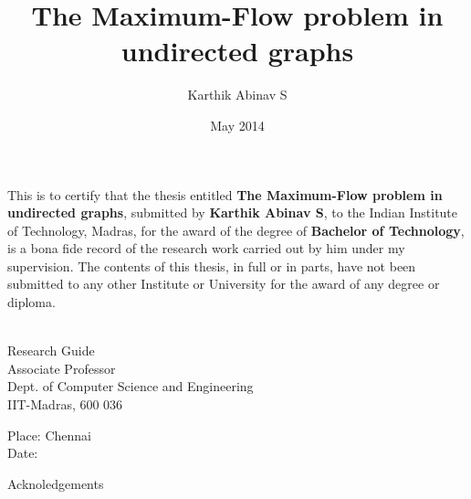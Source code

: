 \documentclass[BTech]{iitmdiss}
\def\thesistitle{The Maximum-Flow problem in undirected graphs}
\def\thesisauthor{Karthik Abinav S}
\begin{document}


\title{\thesistitle}

\author{\thesisauthor}

\date{May 2014}

\begin{singlespace}
\maketitle 
\end{singlespace} 



\certificate

\vspace*{0.5in}

\noindent This is to certify that the thesis entitled {\bf {\thesistitle}}, 
submitted by {\bf {\thesisauthor}}, to the Indian Institute of Technology, 
Madras, for the award of the degree of {\bf Bachelor of Technology}, 
is a bona fide record of the research work carried out by him under my
supervision. The contents of this thesis, in full or in parts, have not been
submitted to any other Institute or University for the award of any degree or
diploma.

\vspace*{1.4in}
\hspace*{-0.25in}
\begin{singlespace}
 \\
\noindent Research Guide \\ 
\noindent Associate Professor \\
\noindent Dept. of Computer Science and Engineering\\
\noindent IIT-Madras, 600 036 \\
\end{singlespace}
\vspace*{0.20in}
\noindent Place: Chennai\\ 
Date:

\acknowledgements

Acknoledgements

\end{document}
